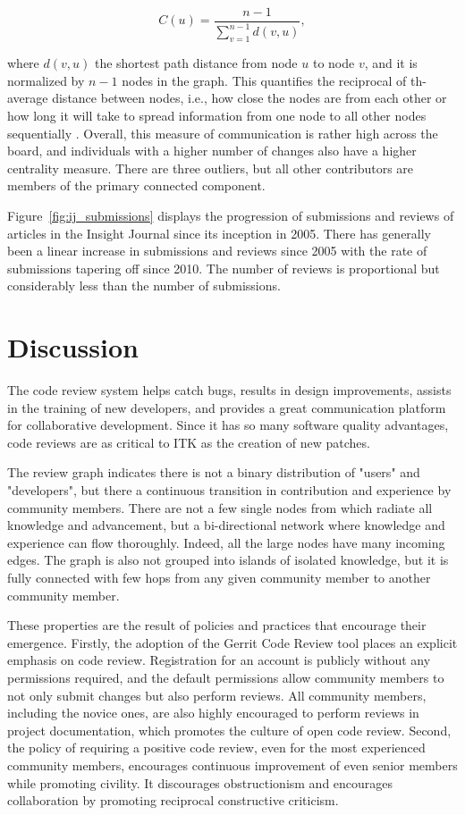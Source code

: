 \documentclass{frontiersENG} %
\begin{document}
\begin{equation}
   C(u) = \frac{n - 1}{\sum_{v=1}^{n-1} d(v, u)},
\end{equation}

where $d(v, u)$ the shortest path distance from node $u$ to node $v$, and it
is normalized by $n-1$ nodes in the graph. This quantifies the reciprocal of th-
average distance between nodes, i.e., how close the nodes are from each other
or how long it will take to spread information from one node to all other
nodes sequentially \cite{Newman2005}. Overall, this measure of communication is
rather high across the board, and individuals with a higher
number of changes also have a higher centrality measure.  There are three
outliers, but all other contributors are members of the primary connected
component.

Figure~\ref{fig:ij_submissions} displays the progression of submissions and
reviews of articles in the Insight Journal since its inception in 2005.  There
has generally been a linear increase in submissions and reviews since 2005
with the rate of submissions tapering off since 2010.  The number of reviews
is proportional but considerably less than the number of submissions.



\section{Discussion}
The code review system helps catch bugs, results in design improvements,
assists in the training of new developers, and provides a great communication
platform for collaborative development. Since it has so many software quality
advantages, code reviews are as critical to ITK as the creation of new patches.


The review graph indicates there is not a binary distribution of "users" and
"developers", but there a continuous transition in contribution and experience
by community members. There are not a few single nodes from which radiate all
knowledge and advancement, but a bi-directional network where knowledge and
experience can flow thoroughly.  Indeed, all the large nodes have many
incoming edges. The graph is also not grouped into islands of
isolated knowledge, but it is fully connected with few hops from any given
community member to another community member.

These properties are the result of policies and practices that encourage their
emergence. Firstly, the adoption of the Gerrit Code Review tool places an
explicit emphasis on code review.  Registration for an account is publicly
without any permissions required, and the default permissions allow community
members to not only submit changes but also perform reviews. All community
members, including the novice ones, are also highly encouraged to perform
reviews in project documentation, which promotes the culture of open code
review. Second, the policy of requiring a positive code review, even for the
most experienced community members, encourages continuous improvement of even
senior members while promoting civility. It discourages obstructionism and
encourages collaboration by promoting reciprocal constructive criticism.
\end{document}

